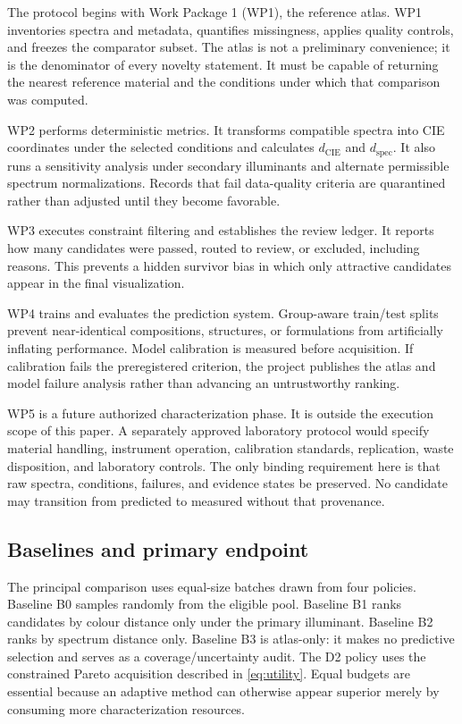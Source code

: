 \documentclass[conference]{IEEEtran}
\begin{document}
The protocol begins with Work Package 1 (WP1), the reference atlas. WP1 inventories spectra and metadata, quantifies missingness, applies quality controls, and freezes the comparator subset. The atlas is not a preliminary convenience; it is the denominator of every novelty statement. It must be capable of returning the nearest reference material and the conditions under which that comparison was computed.

WP2 performs deterministic metrics. It transforms compatible spectra into CIE coordinates under the selected conditions and calculates $d_{\mathrm{CIE}}$ and $d_{\mathrm{spec}}$. It also runs a sensitivity analysis under secondary illuminants and alternate permissible spectrum normalizations. Records that fail data-quality criteria are quarantined rather than adjusted until they become favorable.

WP3 executes constraint filtering and establishes the review ledger. It reports how many candidates were passed, routed to review, or excluded, including reasons. This prevents a hidden survivor bias in which only attractive candidates appear in the final visualization.

WP4 trains and evaluates the prediction system. Group-aware train/test splits prevent near-identical compositions, structures, or formulations from artificially inflating performance. Model calibration is measured before acquisition. If calibration fails the preregistered criterion, the project publishes the atlas and model failure analysis rather than advancing an untrustworthy ranking.

WP5 is a future authorized characterization phase. It is outside the execution scope of this paper. A separately approved laboratory protocol would specify material handling, instrument operation, calibration standards, replication, waste disposition, and laboratory controls. The only binding requirement here is that raw spectra, conditions, failures, and evidence states be preserved. No candidate may transition from predicted to measured without that provenance.

\subsection{Baselines and primary endpoint}

The principal comparison uses equal-size batches drawn from four policies. Baseline B0 samples randomly from the eligible pool. Baseline B1 ranks candidates by colour distance only under the primary illuminant. Baseline B2 ranks by spectrum distance only. Baseline B3 is atlas-only: it makes no predictive selection and serves as a coverage/uncertainty audit. The D2 policy uses the constrained Pareto acquisition described in \eqref{eq:utility}. Equal budgets are essential because an adaptive method can otherwise appear superior merely by consuming more characterization resources.
\end{document}
